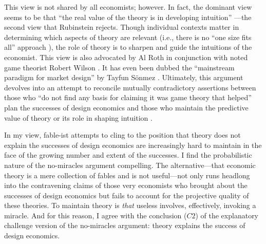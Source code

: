 This view is not shared by all economists; however. In fact, the dominant view seems to be that ``the real value of the theory is in developing intuition'' \autocite[172]{mcafee1996}---the second view that Rubinstein \autocite*{rubinstein2012} rejects. Though individual contexts matter in determining which aspects of theory are relevant (i.e., there is no ``one size fits all'' approach \autocite[C94]{binmore2002}), the role of theory is to sharpen and guide the intuitions of the economist. This view is also advocated by Al Roth in conjunction with noted game theorist Robert Wilson \autocite*{roth2019}. It has even been dubbed the ``mainstream paradigm for market design'' by Tayfun Sönmez \autocite*[10]{sönmez2023minimalist}. Ultimately, this argument devolves into an attempt to reconcile mutually contradictory assertions between those who ``do not find any basis for claiming it was game theory that helped'' \autocite[above]{rubinstein2012} plan the successes of design economics and those who maintain the predictive value of theory or its role in shaping intuition \autocite{roth2019}. 

In my view, fable-ist attempts to cling to the position that theory does not explain the successes of design economics are increasingly hard to maintain in the face of the growing number and extent of the successes. I find the probabilistic nature of the no-miracles argument compelling. The alternative---that economic theory is a mere collection of fables and is not useful---not only runs headlong into the contravening claims of those very economists who brought about the successes of design economics but fails to account for the projective quality of these theories. To maintain theory is \textit{that} useless involves, effectively, invoking a miracle. And for this reason, I agree with the conclusion ($C2$) of the explanatory challenge version of the no-miracles argument: theory explains the success of design economics.



